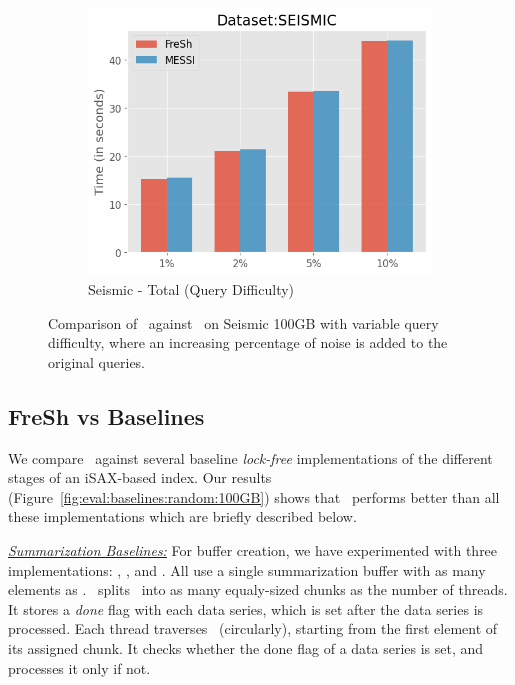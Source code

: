 
\begin{figure}[htbp]
    \centering
    \begin{subfigure}{0.48\textwidth}
        \includegraphics[width=\textwidth]{figures/Experiments/scale-query-difficulty-seismic-total.png}
        \caption{Seismic - Total (Query Difficulty)}
        \label{fig:eval:scale-query-difficulty:seismic:total}
    \end{subfigure}    
    \caption{Comparison of \Fresh\ against \MESSI\ on Seismic 100GB with variable query difficulty,
	 where an increasing percentage of noise is added to the original queries.}
    \label{fig:eval:scale-query-difficulty}
\end{figure}

\subsection{ FreSh vs Baselines}
We compare \Fresh\ against several baseline {\em lock-free} implementations of
the different stages of an iSAX-based index. 
Our results (Figure~\ref{fig:eval:baselines:random:100GB})
shows that \Fresh\ performs better than all these implementations
which are briefly described below.

\noindent
{\emph{\underline{Summarization Baselines:}}}
For buffer creation, we have experimented with three implementations: \DoAllSplit,
\FI, and \CASBased. All use a single summarization buffer with as many
elements as \RawData.
% 
\DoAllSplit\ splits \RawData\ into as many equaly-sized chunks as the number of threads.  
It stores a {\em done} flag with each data series, which is set after the data series is processed.
Each thread traverses \RawData\ (circularly), starting from the first element of its assigned chunk.
It checks whether the done flag of a data series is set, and processes it only if not. 


